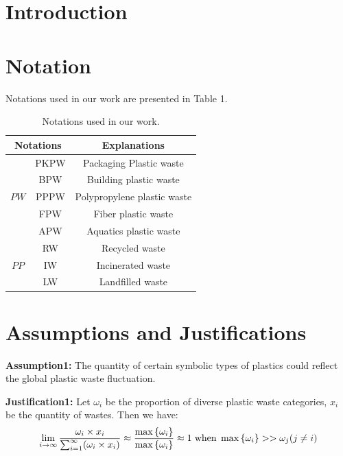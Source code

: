 \documentclass[12pt]{article}
\begin{document}
\section{Introduction}
\section{Notation}
\hspace{2em} Notations used in our work are presented in Table 1.
\begin{table}[h]
	\centering
	\setlength{\tabcolsep}{50pt}
	\begin{adjustwidth}{}{}
		\begin{tabular}{ccc}
			\toprule[2pt]
			\multicolumn{2}{c}{\textbf{Notations}} & \textbf{Explanations} \\
			\midrule[1pt]
			\multirow{5}{*}{$PW$} & PKPW & Packaging Plastic waste \\
			& BPW & Building plastic waste \\
			& PPPW & Polypropylene plastic waste \\
			& FPW & Fiber plastic waste \\
			& APW & Aquatics plastic waste \\
			\midrule[1pt]
			\multirow{3}{*}{$PP$} & RW & Recycled waste \\
			& IW & Incinerated waste \\
			& LW & Landfilled waste\\
			\bottomrule[2pt] 
		\end{tabular}
	\end{adjustwidth}
	\label{notations}
	\caption{Notations used in our work.}
\end{table}
\section{Assumptions and Justifications}
\hspace{2em} \textbf{Assumption1:} The quantity of certain symbolic types of plastics could reflect the global plastic waste fluctuation. 

\textbf{Justification1:} Let $\omega_i$ be the proportion of diverse plastic waste categories, $x_i$ be the quantity of wastes. Then we have:$$\lim_{i\to\infty}\frac{\omega_i\times x_i}{\sum_{i=1}^{\infty}(\omega_i\times x_i)}\approx\frac{\max{\{\omega_i\}}}{\max{\{\omega_i\}}}\approx1 \hspace{0.3em}\text{when}\hspace{0.3em}\max{\{\omega_i\}}>>\omega_j(j\neq i)$$
\end{document}
